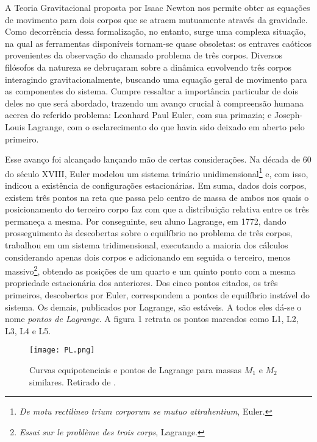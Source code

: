 A Teoria Gravitacional proposta por Isaac Newton nos permite obter as equações de movimento para dois corpos que se atraem mutuamente através da gravidade. Como decorrência dessa formalização, no entanto, surge uma complexa situação, na qual as ferramentas disponíveis tornam-se quase obsoletas: os entraves caóticos provenientes da observação do chamado problema de três corpos. Diversos filósofos da natureza se debruçaram sobre a dinâmica envolvendo três corpos interagindo gravitacionalmente, buscando uma equação geral de movimento para as componentes do sistema. Cumpre ressaltar a importância particular de dois deles no que será abordado, trazendo um avanço crucial à compreensão humana acerca do referido problema: Leonhard Paul Euler, com sua primazia; e Joseph-Louis Lagrange, com o esclarecimento do que havia sido deixado em aberto pelo primeiro.

Esse avanço foi alcançado lançando mão de certas considerações. Na década de 60 do século XVIII, Euler modelou um sistema trinário unidimensional\footnote{\emph{De motu rectilineo trium corporum se mutuo attrahentium}, Euler.} e, com isso, indicou a existência de configurações estacionárias. Em suma, dados dois corpos, existem três pontos na reta que passa pelo centro de massa de ambos nos quais o posicionamento do terceiro corpo faz com que a distribuição relativa entre os três permaneça a mesma. Por conseguinte, seu aluno Lagrange, em 1772, dando prosseguimento às descobertas sobre o equilíbrio no problema de três corpos, trabalhou em um sistema tridimensional, executando a maioria dos cálculos considerando apenas dois corpos e adicionando em seguida o terceiro, menos massivo\footnote{\emph{Essai sur le problème des trois corps}, Lagrange.}, obtendo as posições de um quarto e um quinto ponto com a mesma propriedade estacionária dos anteriores. Dos cinco pontos citados, os três primeiros, descobertos por Euler, correspondem a pontos de equilíbrio instável do sistema. Os demais, publicados por Lagrange, são estáveis. A todos eles dá-se o nome \textit{pontos de Lagrange}. A figura 1 retrata os pontos marcados como L1, L2, L3, L4 e L5.

\begin{figure}[!h]
\centering
\texttt{[image: PL.png]}
\caption{Curvas equipotenciais e pontos de Lagrange para massas $M_1$ e $M_2$ similares. Retirado de \cite[figura 23.68, p. 526]{ksouza}.}
\end{figure}
   
